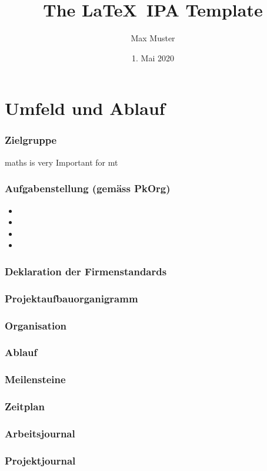 \documentclass{article}
\title{The \LaTeX\  IPA Template}
\author{Max Muster}
\date{1. Mai 2020}
\begin{document}
\maketitle

\newpage
\tableofcontents

\part{Umfeld und Ablauf}
\section{Zielgruppe}
\Gls{maths} is very Important for \acrfull{mt}
\section{Aufgabenstellung (gemäss PkOrg)}
\begin{itemize}
    \item{}
    \item{}
    \item{}
    \item{}
\end{itemize}
\section{Deklaration der Firmenstandards}
\section{Projektaufbauorganigramm}
\section{Organisation}
\section{Ablauf}
\section{Meilensteine}
\section{Zeitplan}
\section{Arbeitsjournal}
\section{Projektjournal}
\end{document}
